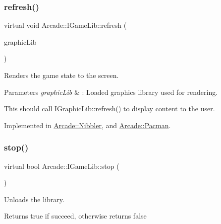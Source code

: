 \mbox{\label{class_arcade_1_1_i_game_lib_a00c3d335ef313e441217b33dcf7844df}} 
\subsubsection{\texorpdfstring{refresh()}{refresh()}}
{\footnotesize\ttfamily virtual void Arcade\+::\+I\+Game\+Lib\+::refresh (\begin{DoxyParamCaption}\item[{\hyperlink{class_arcade_1_1_i_graphic_lib}{I\+Graphic\+Lib} \&}]{graphic\+Lib }\end{DoxyParamCaption})\hspace{0.3cm}{\ttfamily [pure virtual]}}

Renders the game state to the screen. 
\begin{DoxyParams}{Parameters}
{\em graphic\+Lib} & \+: Loaded graphics library used for rendering.\\
\hline
\end{DoxyParams}
This should call I\+Graphic\+Lib\+::refresh() to display content to the user. 

Implemented in \hyperlink{class_arcade_1_1_nibbler_a69a64ec51964772a03cf7d4bb9088b5b}{Arcade\+::\+Nibbler}, and \hyperlink{class_arcade_1_1_pacman_ad0d57afab410c98d4050c030b06ad63a}{Arcade\+::\+Pacman}.

\mbox{\label{class_arcade_1_1_i_game_lib_ab9b7c1bbbea1b86e8515e8fd188fe9cb}} 
\subsubsection{\texorpdfstring{stop()}{stop()}}
{\footnotesize\ttfamily virtual bool Arcade\+::\+I\+Game\+Lib\+::stop (\begin{DoxyParamCaption}{ }\end{DoxyParamCaption})\hspace{0.3cm}{\ttfamily [pure virtual]}}



Unloads the library. 

\begin{DoxyReturn}{Returns}
true if succeed, otherwise returns false 
\end{DoxyReturn}


